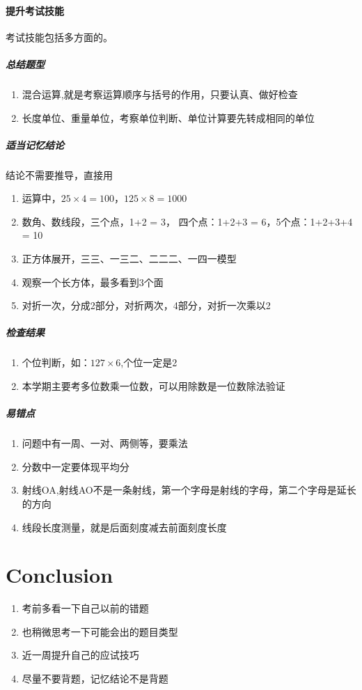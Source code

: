 \documentclass[a4paper,12pt]{article}
\begin{document}
\subsection{提升考试技能}
考试技能包括多方面的。
\subsubsection{总结题型}

\begin{enumerate}
        \item 混合运算,就是考察运算顺序与括号的作用，只要认真、做好检查
        \item 长度单位、重量单位，考察单位判断、单位计算要先转成相同的单位
\end{enumerate}
\subsubsection{适当记忆结论}
结论不需要推导，直接用
\begin{enumerate}
        \item 运算中，$25 \times 4 = 100$，$125\times 8 = 1000$
        \item 数角、数线段，三个点，1+2 = 3， 四个点：1+2+3 = 6，5个点：1+2+3+4 = 10
        \item 正方体展开，三三、一三二、二二二、一四一模型
        \item 观察一个长方体，最多看到3个面
        \item 对折一次，分成2部分，对折两次，4部分，对折一次乘以2
\end{enumerate}

\subsubsection{检查结果}
\begin{enumerate}
        \item 个位判断，如：$127 \times 6$,个位一定是2
        \item 本学期主要考多位数乘一位数，可以用除数是一位数除法验证

\end{enumerate}
\subsubsection{易错点}
\begin{enumerate}
        \item 问题中有一周、一对、两侧等，要乘法
        \item 分数中一定要体现平均分
        \item 射线OA,射线AO不是一条射线，第一个字母是射线的字母，第二个字母是延长的方向
        \item 线段长度测量，就是后面刻度减去前面刻度长度

\end{enumerate}


\part*{Conclusion}\label{sec:name}
\begin{enumerate}
        \item 考前多看一下自己以前的错题
        \item 也稍微思考一下可能会出的题目类型
        \item 近一周提升自己的应试技巧
        \item 尽量不要背题，记忆结论不是背题

\end{enumerate}
\end{document}
